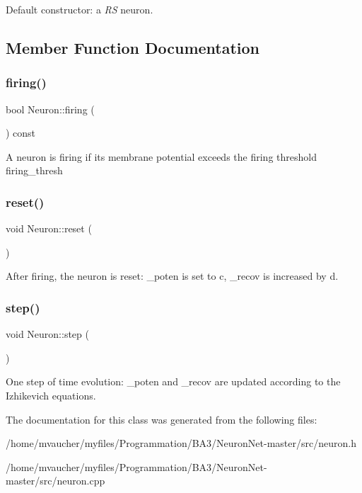 Default constructor\+: a {\itshape RS} neuron. 

\subsection{Member Function Documentation}
\mbox{\label{classNeuron_a4f477ebb623a7681c0f09dbfc4608a0d}} 
\subsubsection{\texorpdfstring{firing()}{firing()}}
{\footnotesize\ttfamily bool Neuron\+::firing (\begin{DoxyParamCaption}{ }\end{DoxyParamCaption}) const\hspace{0.3cm}{\ttfamily [inline]}}

A neuron is firing if its membrane potential exceeds the firing threshold firing\+\_\+thresh \mbox{\label{classNeuron_a6817fc5bf2128150b41b65e74f018408}} 
\subsubsection{\texorpdfstring{reset()}{reset()}}
{\footnotesize\ttfamily void Neuron\+::reset (\begin{DoxyParamCaption}{ }\end{DoxyParamCaption})\hspace{0.3cm}{\ttfamily [inline]}}

After firing, the neuron is reset\+: \+\_\+poten is set to {\ttfamily c}, \+\_\+recov is increased by {\ttfamily d}. \mbox{\label{classNeuron_a224d5cead5f94bbe15ae49774db3e174}} 
\subsubsection{\texorpdfstring{step()}{step()}}
{\footnotesize\ttfamily void Neuron\+::step (\begin{DoxyParamCaption}{ }\end{DoxyParamCaption})}

One step of time evolution\+: \+\_\+poten and \+\_\+recov are updated according to the Izhikevich equations. 

The documentation for this class was generated from the following files\+:\begin{DoxyCompactItemize}
\item 
/home/mvaucher/myfiles/\+Programmation/\+B\+A3/\+Neuron\+Net-\/master/src/neuron.\+h\item 
/home/mvaucher/myfiles/\+Programmation/\+B\+A3/\+Neuron\+Net-\/master/src/neuron.\+cpp\end{DoxyCompactItemize}
